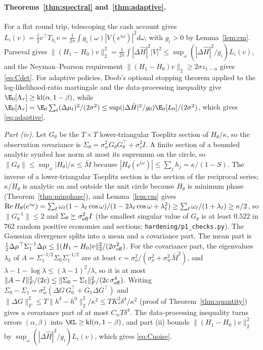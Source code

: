 \paragraph{Theorems~\ref{thm:spectral} and~\ref{thm:adaptive}.} For a flat round trip, telescoping the cash account gives $L_i(v)=\tfrac12v^\top T_{h_i}v=\frac1{2\pi}\int g_i(\omega)|V(e^{i\omega})|^2d\omega$, with $g_i>0$ by Lemma~\ref{lem:cm}. Parseval gives $\|(H_1-H_0)v\|_2^2=\frac1{2\pi}\int|\Delta\hat H|^2|V|^2\le\sup_\omega(|\Delta\hat H|^2/g_i)L_i(v)$, and the Neyman--Pearson requirement $\|(H_1-H_0)v\|_2\ge2\sigma z_{1-\alpha}$ gives \eqref{eq:Cdet}. For adaptive policies, Doob's optional stopping theorem applied to the log-likelihood-ratio martingale and the data-processing inequality give $\E_0[\Lambda_\tau]\ge{\rm kl}(\alpha,1-\beta)$, while $\E_0[\Lambda_\tau]=\E_0\sum_t(\Delta\mu_t)^2/(2\sigma^2)\le\sup(|\Delta\hat H|^2/g_0)\E_0[L_0]/(2\sigma^2)$, which gives \eqref{eq:adaptive}.

\emph{Part (iv).} Let $G_\theta$ be the $T\times T$ lower-triangular Toeplitz section of $H_\theta/\kappa$, so the observation covariance is $\Sigma_\theta=\sigma_w^2G_\theta G_\theta^\top+\sigma_\nu^2I$. A finite section of a bounded analytic symbol has norm at most its supremum on the circle, so $\|G_\theta\|\le\sup_\omega|H_\theta|/\kappa\le\bar M$ because $|H_\theta(e^{i\omega})|\le\sum_jh_j=\kappa/(1-S)$. The inverse of a lower-triangular Toeplitz section is the section of the reciprocal series; $\kappa/H_\theta$ is analytic on and outside the unit circle because $H_\theta$ is minimum phase (Theorem~\ref{thm:minphase}), and Lemma~\ref{lem:cm} gives ${\rm Re}\,H_\theta(e^{i\omega})=\sum_\ell\omega_\ell(1-\lambda_\ell\cos\omega)/(1-2\lambda_\ell\cos\omega+\lambda_\ell^2)\ge\sum_\ell\omega_\ell/(1+\lambda_\ell)\ge\kappa/2$, so $\|G_\theta^{-1}\|\le2$ and $\Sigma_\theta\succeq\sigma_{\rm eff}^2I$ (the smallest singular value of $G_\theta$ is at least $0.522$ in 762 random positive economies and sections; \texttt{hardening/p1\_checks.py}). The Gaussian divergence splits into a mean and a covariance part. The mean part is $\tfrac12\Delta\mu^\top\Sigma_1^{-1}\Delta\mu\le\|(H_1-H_0)v\|_2^2/(2\sigma_{\rm eff}^2)$. For the covariance part, the eigenvalues $\lambda_k$ of $A=\Sigma_1^{-1/2}\Sigma_0\Sigma_1^{-1/2}$ are at least $c=\sigma_\nu^2/(\sigma_\nu^2+\sigma_w^2\bar M^2)$, and $\lambda-1-\log\lambda\le(\lambda-1)^2/\lambda$, so it is at most $\|A-I\|_F^2/(2c)\le\|\Sigma_0-\Sigma_1\|_F^2/(2c\,\sigma_{\rm eff}^4)$. Writing $\Sigma_0-\Sigma_1=\sigma_w^2(\Delta G\,G_0^\top+G_1\Delta G^\top)$ and $\|\Delta G\|_F^2\le T\|h^\delta-h^0\|_2^2/\kappa^2\le TK_*^2\delta^4/\kappa^2$ (proof of Theorem~\ref{thm:quantity}) gives a covariance part of at most $C_wT\delta^4$. The data-processing inequality turns errors $(\alpha,\beta)$ into $\KL\ge{\rm kl}(\alpha,1-\beta)$, and part (ii) bounds $\|(H_1-H_0)v\|_2^2$ by $\sup_\omega(|\Delta\hat H|^2/g_i)L_i(v)$, which gives \eqref{eq:Cnoise}.

